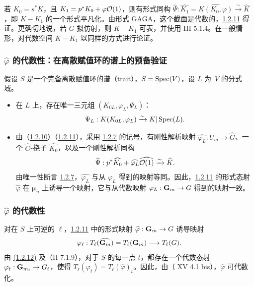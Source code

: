 若 $K_{0}=s^{\ast}K$，且 $K_{1}=p^{\ast}K_{0}+\varphi{\mathcal O}(1)$，则有形式同构 $\widehat{\Psi}:\widehat{K_{1}}=\widehat{K(K_{0},\varphi)}\xrightarrow{\sim}\widehat{K}$，即 $K-K_{1}$ 的一个形式平凡化。由形式 GAGA，这个截面是代数的，\hyperref[XVIII.subsubsec1.2.11]{1.2.11} 得证。更确切地说，若 $G$ 拟仿射，则 $K-K_{1}$ 可表，并使用 \EGA III 5.1.4。在一般情形，对代数空间 $K-K_{1}$ 以同样的方式进行论证。

\subsubsection{$\widehat{\varphi}$ 的代数性：在离散赋值环的谱上的预备验证}

假设 $S$ 是一个完备离散赋值环的谱（trait），$S=\operatorname{Spec}(V)$，设 $L$ 为~$V$ 的分式域。
\begin{itemize}
\item[a)] 在 $L$ 上，存在唯一三元组 $(K_{0L},\varphi_{L},\Psi_{L})$：
$$
\Psi_{L}:K(K_{0L},\varphi_{L})\xrightarrow{\sim} K|\operatorname{Spec} (L){}.
$$

\item[b)] 由（\hyperref[XVIII.subsubsec1.2.10]{1.2.10}）（\hyperref[XVIII.subsubsec1.2.11]{1.2.11}），采用 \hyperref[XVIII.subsubsec1.2.7]{1.2.7} 的记号，有刚性解析映射 $\widehat{\varphi_{L}}:U_{m}\rightarrow \widehat{G}$、一个 $\widehat{G}$-挠子 $\widehat{K_{0}}$，以及一个刚性解析同构
$$
\widehat{\Psi}:p^{\ast}\widehat{K_0}+\widehat{\varphi_{L}}
\widehat{{\mathcal O}(1)}\xrightarrow{\sim}
\widehat{K}{}.
$$
由唯一性断言 \hyperref[XVIII.subsubsec1.2.7]{1.2.7}，$\widehat{\varphi_{L}}$ 与从 $\varphi_{L}$ 得到的映射等同。因此，\hyperref[XVIII.subsubsec1.2.11]{1.2.11} 的形式态射 $\widehat{\varphi}$ 在 $𝛍_{n}$ 上诱导一个映射，它与从代数映射 $\varphi_{L}:\mathbf{G}_{m}\rightarrow G$ 得到的映射一致。
\end{itemize}

\subsubsection{$\widehat{\varphi}$ 的代数性}

对在 $S$ 上可逆的 $\ell$，\hyperref[XVIII.subsubsec1.2.11]{1.2.11} 中的形式映射 $\widehat{\varphi}:\mathbf{G}_{m}\rightarrow G$ 诱导映射
$$
\varphi_{\ell}:T_{\ell}(\widehat{\mathbf{G}_{m}})=T_{\ell}(\mathbf{G}_{m})\longrightarrow
T_{\ell}(G){}.
$$
由 \hyperref[XVIII.subsubsec1.2.12]{(1.2.12)} 及（\EGA II 7.1.9），对于 $S$ 的每一点 $t$，都存在一个\pageoriginale{}代数态射 $\varphi_{t}:\mathbf{G}_{m_{t}}\rightarrow G_{t}$，使得 $T_{\ell}(\varphi_{t})=T_{\ell}(\widehat{\varphi})_{t}$。因此，由（ XV 4.1 bis），$\widehat{\varphi}$ 可代数化。

